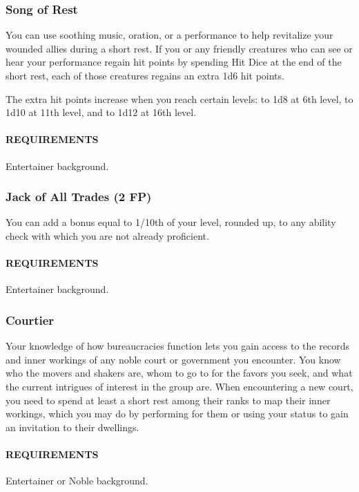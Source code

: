     \subsubsection{Song of Rest} \label{feat::songofrest}
        You can use soothing music, oration, or a performance to help revitalize your wounded allies during a short rest.
        If you or any friendly creatures who can see or hear your performance regain hit points by spending Hit Dice at the end of the short rest, each of those creatures regains an extra 1d6 hit points.

        The extra hit points increase when you reach certain levels: to 1d8 at 6th level, to 1d10 at 11th level, and to 1d12 at 16th level.
        \paragraph{REQUIREMENTS} Entertainer background.

    \subsubsection{Jack of All Trades (2 FP)} \label{feat::jackofalltrades}
        You can add a bonus equal to 1/10th of your level, rounded up, to any ability check with which you are not already proficient.
        \paragraph{REQUIREMENTS} Entertainer background.

    \subsubsection{Courtier} \label{feat::courtier}
        Your knowledge of how bureaucracies function lets you gain access to the records and inner workings of any noble court or government you encounter.
        You know who the movers and shakers are, whom to go to for the favors you seek, and what the current intrigues of interest in the group are.
        When encountering a new court, you need to spend at least a short rest among their ranks to map their inner workings, which you may do by performing for them or using your status to gain an invitation to their dwellings.
        \paragraph{REQUIREMENTS} Entertainer or Noble background.

